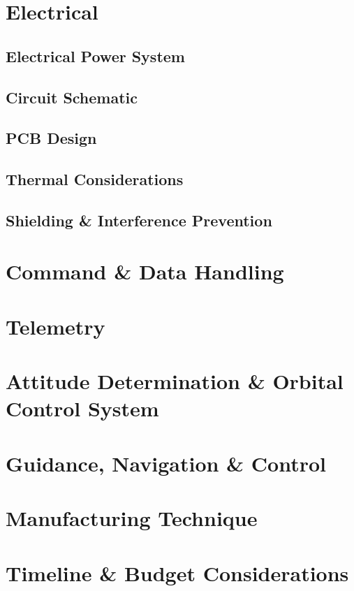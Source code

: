 \documentclass[11pt, a4paper]{article}
\begin{document}
\section{Electrical}
\subsection{Electrical Power System}
\subsection{Circuit Schematic}
\subsection{PCB Design}
\subsection{Thermal Considerations}
\subsection{Shielding \& Interference Prevention}

\section{Command \& Data Handling}
\subsection{}

\section{Telemetry}

\section{Attitude Determination \& Orbital Control System}

\section{Guidance, Navigation \& Control}

\section{Manufacturing Technique}

\section{Timeline \& Budget Considerations}

\pagebreak

\end{document}
